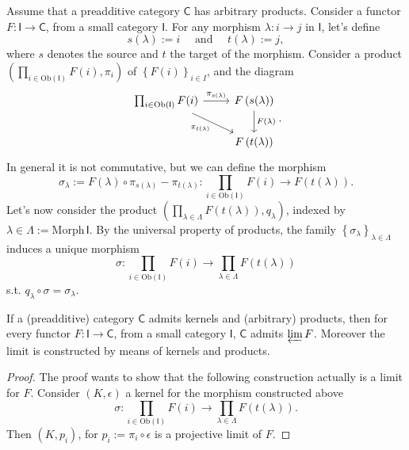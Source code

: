 \begin{rem}
	Assume that a preadditive category $\mathsf{C}$ has arbitrary products.
	Consider a functor $F: \mathsf{I} \to \mathsf{C}$, from a small category $\mathsf{I}$.
	For any morphism $\lambda: i \to j$ in $\mathsf{I}$, let's define
	\begin{equation}
		s(\lambda) := i \quad \text{ and } \quad t(\lambda) := j
	,\end{equation} 
	where $s$ denotes the source and $t$ the target of the morphism.
	Consider a product
	$\left(\prod_{i \in \mathrm{Ob} \left(\mathsf{I}\right)} F(i),  \pi_i \right)$
	of $\left\{ F(i) \right\}_{i \in I}$, and the diagram
	\begin{equation}
	\begin{tikzcd}
		\prod_{i \in \mathrm{Ob} \left(\mathsf{I}\right)} F(i) \arrow[r, "\pi_{s(\lambda)}", rightarrow] 
		\arrow[rd, "\pi_{t(\lambda)}"', rightarrow] &
		F \left( s(\lambda) \right) \arrow[d, "F(\lambda)", rightarrow] \\
		& F \left( t(\lambda) \right)
	\end{tikzcd}
	.\end{equation} 
	In general it is not commutative, but we can define the morphism
	\begin{equation}
		\sigma_\lambda := F(\lambda) \circ \pi_{s(\lambda)} - \pi_{t(\lambda)}: \prod_{i \in \mathrm{Ob} \left(\mathsf{I}\right)} F(i) \to F \left( t(\lambda) \right)
	.\end{equation} 
	Let's now consider the product $\left(\prod_{\lambda \in \Lambda} F \left( t(\lambda) \right), q_\lambda\right)$, indexed by $\lambda \in \Lambda := \mathrm{Morph}\, \mathsf{I}$.
	By the universal property of products, the family $\left\{ \sigma_\lambda \right\}_{\lambda \in \Lambda}$ induces a unique morphism
	 \begin{equation}
		 \sigma: \prod_{i \in \mathrm{Ob} \left(\mathsf{I}\right)} F(i) \to \prod_{\lambda \in \Lambda} F \left( t(\lambda) \right)
	\end{equation} 
	s.t. $q_\lambda \circ\sigma = \sigma_\lambda$.
\end{rem}

\begin{prop}\label{prop:LimConstr}
	If a (preadditive) category $\mathsf{C}$ admits kernels and (arbitrary) products,
	then for every functor $F: \mathsf{I} \to \mathsf{C}$, from a small category $\mathsf{I}$, 
	$\mathsf{C}$ admits $\varprojlim F$.
	Moreover the limit is constructed by means of kernels and products.
\end{prop} 
\begin{proof}
	The proof wants to show that the following construction actually is a limit for $F$.
	Consider $\left(K, \epsilon\right)$ a kernel for the morphism constructed above
	\begin{equation}
		\sigma: \prod_{i \in \mathrm{Ob} \left(\mathsf{I}\right)} F(i) \to \prod_{\lambda \in \Lambda} F \left( t(\lambda) \right)
	.\end{equation} 
	Then $\left(K, p_i\right)$, for $p_i := \pi_i \circ\epsilon$ is a projective limit of $F$.
\end{proof}

